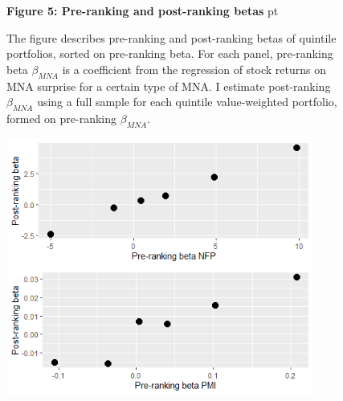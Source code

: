 \documentclass[12pt]{article}
\begin{document}
\begin{figure}[h!]
\textbf{Figure 5: Pre-ranking and post-ranking betas}
 pt
\begin{flushleft}
{The figure describes pre-ranking and post-ranking betas of quintile portfolios, sorted on pre-ranking beta. For each panel, pre-ranking beta $\beta_{MNA}$ is a coefficient from the regression of stock returns on MNA surprise for a certain type of MNA. I estimate post-ranking $\beta_{MNA}$ using a full sample for each quintile value-weighted portfolio, formed on pre-ranking $\beta_{MNA}$. }
\end{flushleft}
\centering
\vspace{0.64cm}
\includegraphics[width=0.9\textwidth]{old_files/i102_f1a.png}
\vspace{0.64cm}
\includegraphics[width=0.9\textwidth]{old_files/i102_f1b.png}
\end{figure}


\pagebreak

\newpage

\clearpage
\end{document}
